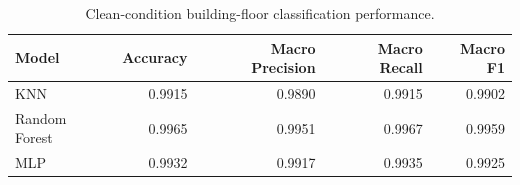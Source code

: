 \begin{table}
\caption{Clean-condition building-floor classification performance.}
\label{tab:classification_baselines}
\begin{tabular}{lrrrr}
\toprule
Model & Accuracy & Macro Precision & Macro Recall & Macro F1 \\
\midrule
KNN & 0.9915 & 0.9890 & 0.9915 & 0.9902 \\
Random Forest & 0.9965 & 0.9951 & 0.9967 & 0.9959 \\
MLP & 0.9932 & 0.9917 & 0.9935 & 0.9925 \\
\bottomrule
\end{tabular}
\end{table}
